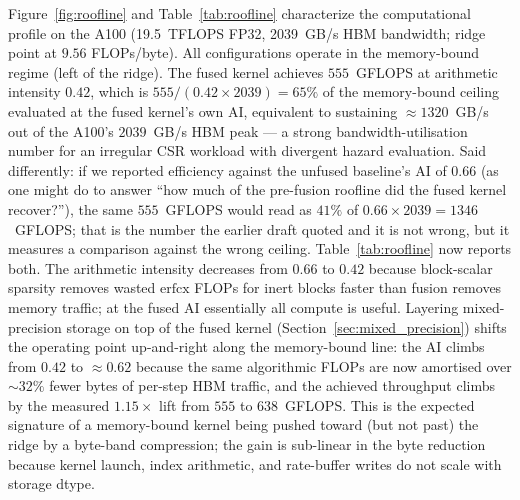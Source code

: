 Figure~\ref{fig:roofline} and Table~\ref{tab:roofline} characterize the computational profile on the A100 (19.5~TFLOPS FP32, 2039~GB/s HBM bandwidth; ridge point at $9.56$ FLOPs/byte). All configurations operate in the memory-bound regime (left of the ridge). The fused kernel achieves $555$~GFLOPS at arithmetic intensity $0.42$, which is $555 / (0.42 \times 2039) = 65\%$ of the memory-bound ceiling evaluated at the fused kernel's own AI, equivalent to sustaining $\approx 1320$~GB/s out of the A100's $2039$~GB/s HBM peak --- a strong bandwidth-utilisation number for an irregular CSR workload with divergent hazard evaluation. Said differently: if we reported efficiency against the unfused baseline's AI of $0.66$ (as one might do to answer ``how much of the pre-fusion roofline did the fused kernel recover?''), the same $555$~GFLOPS would read as $41\%$ of $0.66 \times 2039 = 1346$~GFLOPS; that is the number the earlier draft quoted and it is not wrong, but it measures a comparison against the wrong ceiling. Table~\ref{tab:roofline} now reports both. The arithmetic intensity decreases from $0.66$ to $0.42$ because block-scalar sparsity removes wasted $\mathrm{erfcx}$ FLOPs for inert blocks faster than fusion removes memory traffic; at the fused AI essentially all compute is useful. Layering mixed-precision storage on top of the fused kernel (Section~\ref{sec:mixed_precision}) shifts the operating point up-and-right along the memory-bound line: the AI climbs from $0.42$ to $\approx 0.62$ because the same algorithmic FLOPs are now amortised over $\sim\!32\%$ fewer bytes of per-step HBM traffic, and the achieved throughput climbs by the measured $1.15\times$ lift from $555$ to $638$~GFLOPS. This is the expected signature of a memory-bound kernel being pushed toward (but not past) the ridge by a byte-band compression; the gain is sub-linear in the byte reduction because kernel launch, index arithmetic, and rate-buffer writes do not scale with storage dtype.

